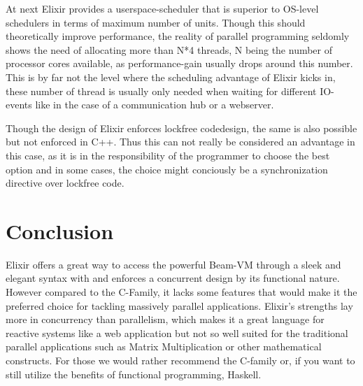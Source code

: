 \documentclass[]{paper}
\begin{document}
At next Elixir provides a userspace-scheduler that is superior to OS-level schedulers in terms of maximum number of units. Though this should theoretically improve performance, the reality of parallel programming seldomly shows the need of allocating more than N*4 threads, N being the number of processor cores available, as performance-gain usually drops around this number. This is by far not the level where the scheduling advantage of Elixir kicks in, these number of thread is usually only needed when waiting for different IO-events like in the case of a communication hub or a webserver.

Though the design of Elixir enforces lockfree codedesign, the same is also possible but not enforced in C++. Thus this can not really be considered an advantage in this case, as it is in the responsibility of the programmer to choose the best option and in some cases, the choice might conciously be a synchronization directive over lockfree code.

\section{Conclusion}

Elixir offers a great way to access the powerful Beam-VM through a sleek and elegant syntax with and enforces a concurrent design by its functional nature. However compared to the C-Family, it lacks some features that would make it the preferred choice for tackling massively parallel applications. Elixir's strengths lay more in concurrency than parallelism, which makes it a great language for reactive systems like a web application but not so well suited for the traditional parallel applications such as Matrix Multiplication or other mathematical constructs. For those we would rather recommend the C-family or, if you want to still utilize the benefits of functional programming, Haskell. 



\end{document}
